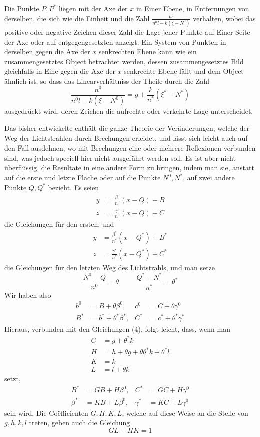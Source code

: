 Die Punkte $P,P^*$ liegen mit der Axe der $x$ in Einer Ebene, in Entfernungen von derselben, die sich wie die Einheit und die Zahl $\frac{n^0}{n^0l-k(\xi-N^0)}$ verhalten, wobei das positive oder negative Zeichen dieser Zahl die Lage jener Punkte auf Einer Seite der Axe oder auf entgegengesetzten anzeigt. Ein System von Punkten in derselben gegen die Axe der $x$ senkrechten Ebene kann wie ein zusammengesetztes Object betrachtet werden, dessen zusammengesetztes Bild gleichfalls in Eine gegen die Axe der $x$ senkrechte Ebene fällt und dem Object ähnlich ist, so dass das Linearverhältniss der Theile durch die Zahl
\[
\frac{n^0}{n^0l-k(\xi-N^0)}=g+\frac{k}{n^*}(\xi^*-N^*)
\]
ausgedrückt wird, deren Zeichen die aufrechte oder verkehrte Lage unterscheidet.

Das bisher entwickelte enthält die ganze Theorie der Veränderungen, welche der Weg der Lichtstrahlen durch Brechungen erleidet, und lässt sich leicht auch auf den Fall ausdehnen, wo mit Brechungen eine oder mehrere Reflexionen verbunden sind, was jedoch speciell hier nicht ausgeführt werden soll. Es ist aber nicht überflüssig, die Resultate in eine andere Form zu bringen, indem man sie, anstatt auf die erste und letzte Fläche oder auf die Punkte $N^0,N^*$, auf zwei andere Punkte $Q,Q^*$ bezieht. Es seien
\[
\begin{aligned}
y&=\frac{\beta^0}{n^0}(x-Q)+B\\
z&=\frac{\gamma^0}{n^0}(x-Q)+C
\end{aligned}
\]
die Gleichungen für den ersten, und
\[
\begin{aligned}
y&=\frac{\beta^*}{n^*}(x-Q^*)+B^*\\
z&=\frac{\gamma^*}{n^*}(x-Q^*)+C^*
\end{aligned}
\]
die Gleichungen für den letzten Weg des Lichtstrahls, und man setze
\[
\frac{N^0-Q}{n^0}=\theta,\qquad \frac{Q^*-N^*}{n^*}=\theta^*
\]
Wir haben also
\[
\begin{aligned}
b^0&=B+\theta\beta^0,&c^0&=C+\theta\gamma^0\\
B^*&=b^*+\theta^*\beta^*,&C^*&=c^*+\theta^*\gamma^*
\end{aligned}
\]
Hieraus, verbunden mit den Gleichungen (4), folgt leicht, dass, wenn man
\[
\begin{aligned}
G&=g+\theta^*k\\
H&=h+\theta g+\theta\theta^*k+\theta^*l\\
K&=k\\
L&=l+\theta k
\end{aligned}
\]
setzt,
\[
\begin{aligned}
B^*&=GB+H\beta^0,&C^*&=GC+H\gamma^0\\
\beta^*&=KB+L\beta^0,&\gamma^*&=KC+L\gamma^0
\end{aligned}
\]
sein wird. Die Coëfficienten $G,H,K,L$, welche auf diese Weise an die Stelle von $g,h,k,l$ treten, geben auch die Gleichung
\[
GL-HK=1
\]

